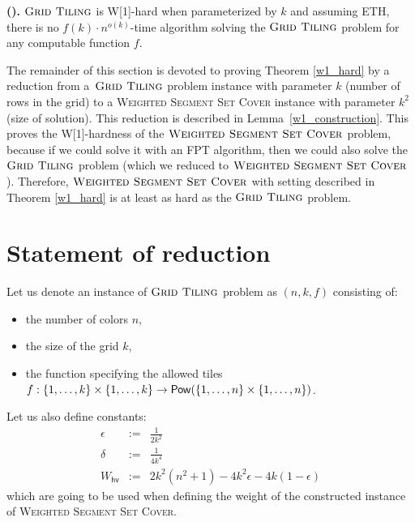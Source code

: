 

\begin{tw}
\label{grid_tiling_w1_hard}
\textbf{(\cite{marx_grid_tiling}).}
$\textsc{Grid Tiling}$ is W[1]-hard when parameterized by $k$ and
assuming ETH, there is no $f(k)\cdot n^{o(k)}$-time
algorithm solving the $\textsc{Grid Tiling}$ problem
for any computable function $f$.
\end{tw}

The remainder of this section is devoted to proving Theorem \ref{w1_hard}
by a reduction from a~$\textsc{Grid Tiling}$ problem instance
with parameter $k$ (number of rows in the grid)
to a \textsc{Weighted} \textsc{Segment} \textsc{Set} \textsc{Cover}
instance with parameter $k^2$ (size of solution).
This reduction is described in Lemma~\ref{w1_construction}.
This proves the W[1]-hardness of the $\textsc{Weighted Segment Set Cover}$ problem,
because if we could solve it with an FPT algorithm,
then we could also solve the $\textsc{Grid Tiling}$ problem
(which we reduced to $\textsc{Weighted Segment Set Cover}$).
Therefore, $\textsc{Weighted Segment Set Cover}$ with setting
described in Theorem \ref{w1_hard}
is at least as hard as the $\textsc{Grid Tiling}$ problem.

\newcommand{\hvWeight}{W_{\mathsf{hv}}}
\newcommand{\solWeight}{\hvWeight+k^2\delta }
\newcommand{\instanceSetCover}{(\points, \sets, w, 3k^2+2k)}
\newcommand{\instanceGridTiling}{(n,k,f)}
\newcommand{\yes}{\texttt{YES}}
\newcommand{\no}{\texttt{NO}}

\section{Statement of reduction}

Let us denote an instance of $\textsc{Grid Tiling}$ problem as $\instanceGridTiling$ consisting of:
\begin{itemize}
\item the number of colors $n$,
\item the size of the grid $k$,
\item the function specifying the allowed tiles
$f : \{1, \ldots, k\} \times \{1, \ldots, k\} \rightarrow \mathsf{Pow}(\{1, \ldots, n\} \times \{1, \ldots, n\})$.
\end{itemize}

Let us also define constants: 
\begin{eqnarray*}
\epsilon & := & \frac{1}{2k^2} \\
\delta & := & \frac{1}{4k^4} \\
\hvWeight & := & 2k^2(n^2+1) -4k^2\epsilon -4k(1-\epsilon)
\end{eqnarray*}
which are going to be used when defining the weight of the constructed
instance of \textsc{Weighted} \textsc{Segment} \textsc{Set} \textsc{Cover}.


